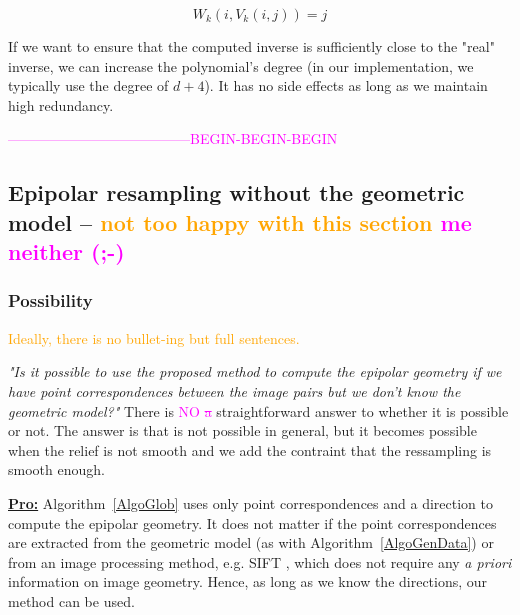 \documentclass{ipol}
\newcommand{\er}[1]{\textcolor{orange}{#1}}
\newcommand{\mpd}[1]{\textcolor{magenta}{#1}}
\newcommand{\BEGINCHANGE} {\textcolor{magenta}{ ---------------------------------------BEGIN-BEGIN-BEGIN}}
\begin{document}
\begin{equation}
   W_k(i,V_k(i,j))  = j \label{InverseEpip}
\end{equation}

If we want to ensure that the computed inverse is sufficiently close
to the "real" inverse, we can increase the polynomial's degree (in our implementation, we typically use the degree of $d+4$). It has no side effects as long as we maintain high redundancy.


\BEGINCHANGE{}

\subsection{Epipolar resampling without the geometric model -- \er{not too happy with this section} \mpd{me neither (;-)}}

\subsubsection{Possibility}

\label{EpipTieP}
\er{Ideally, there is no bullet-ing but full sentences.}


\emph{"Is it possible to use
the proposed method to compute the epipolar geometry
if we have point correspondences between the image pairs but we don't know the geometric model?"} There is \mpd{NO \sout{a}}
 straightforward answer to whether it is possible or not. The answer is that is not possible in general,
but it becomes possible when the relief is not smooth and we add the contraint that the ressampling is smooth enough.
%

{\underline {\bf Pro:}}  Algorithm~\ref{AlgoGlob} uses only point correspondences and a
direction to compute the epipolar geometry. It does not matter if the point correspondences are extracted from the geometric model
(as with Algorithm~\ref{AlgoGenData}) or from an image 
processing method, e.g. SIFT \cite{lowe2004distinctive}, which does not require any
\emph{a priori} information on image geometry. Hence, as long as 
we know the directions, our method can be used.
\end{document}
